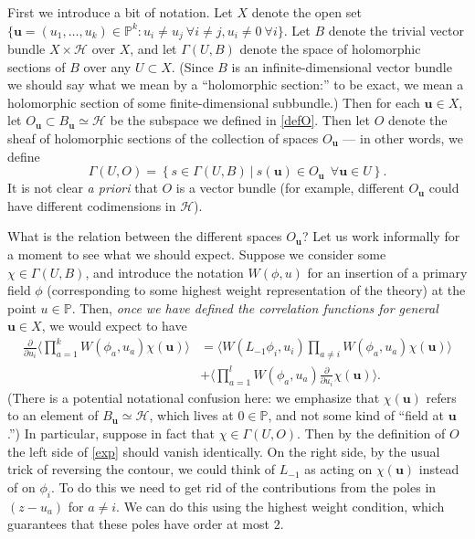 \documentclass[a4paper,12pt]{article}
\newcommand{\uu}{{\mathbf u}}
\newcommand{\PP}{{\mathbb P}}
\newcommand{\F}{{\mathcal H}}
\newcommand{\IP}[1]{\langle#1\rangle}
\newcommand{\iso}{\simeq}
\newcommand{\dwrt}[1]{\frac{\partial}{\partial#1}}
\newcommand{\ti}[1]{\textit{#1}}
\begin{document}
First we introduce a bit of notation.
Let $X$ denote the open set $\{ \uu = (u_1, \dots, u_k) \in \PP^k : u_i \ne u_j \ \forall i \ne j, u_i \ne 0 \ \forall i \}$.
Let $B$ denote the trivial vector bundle $X \times \F$ over $X$, and let $\Gamma(U,B)$ denote the space
of holomorphic sections of $B$ over any $U \subset X$.  (Since $B$ is an infinite-dimensional vector bundle
we should say what we mean by a ``holomorphic section:''  to be exact, we mean a holomorphic section of
some finite-dimensional subbundle.)  Then for each $\uu \in X$, let $O_\uu \subset
B_\uu \iso \F$ be the subspace we defined in \eqref{defO}.  Then let $O$ denote the sheaf
of holomorphic sections of the collection of spaces $O_\uu$ --- in other words, we define
\begin{equation}
\Gamma(U, O) = \left\{ s \in \Gamma(U, B) \ \Big\vert \ s(\uu) \in O_\uu \ \ \forall \uu \in U \right\}.
\end{equation}
It is not clear \ti{a priori}
that $O$ is a vector bundle (for example, different
$O_\uu$ could have different codimensions in $\F$).

What is the relation between the different spaces $O_\uu$?  Let us work informally for
a moment to see what we should expect.  Suppose we consider
some $\chi \in \Gamma(U, B)$, and introduce the notation $W(\phi, u)$ for
an insertion of a primary field $\phi$ (corresponding to some highest weight representation
of the theory) at the point $u \in \PP$.
Then, \ti{once we have defined the correlation functions for general $\uu \in X$},
we would expect to have
\begin{equation} \label{exp}
\begin{split}
\dwrt{u_i} \IP{\prod_{a=1}^k W(\phi_a, u_a) \chi(\uu)} & = \IP{W(L_{-1} \phi_i, u_i) \prod_{a \ne i} W(\phi_a, u_a) \chi(\uu)} \\
                                                       & + \IP{\prod_{a=1}^l W(\phi_a, u_a) \dwrt{u_i} \chi(\uu)}.
\end{split}
\end{equation}
(There is a potential notational confusion here:  we emphasize that $\chi(\uu)$ refers to an element 
of $B_\uu \iso \F$, which lives at $0 \in \PP$, and not some kind of ``field at $\uu$.'')
In particular, suppose in fact that $\chi \in \Gamma(U, O)$.
Then by the definition of $O$ the left side of \eqref{exp} should vanish identically.
On the right side, by the usual trick of reversing the contour, we could think of $L_{-1}$ as acting on
$\chi(\uu)$ instead of on $\phi_i$.  To do this we need to get rid of the contributions from the poles
in $(z-u_a)$ for $a \ne i$.  We can do this using the highest weight condition, which
guarantees that these poles have order at most $2$.  
\end{document}
